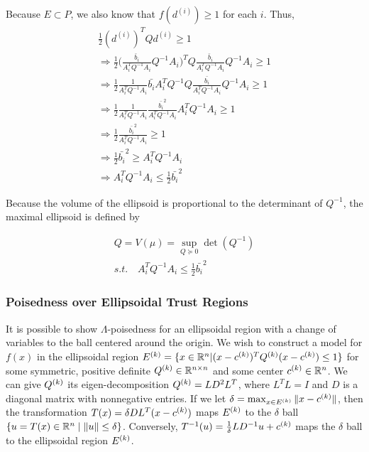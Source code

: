 Because $E \subset P$, we also know that $f(d^{(i)}) \ge 1$ for each $i$. Thus,
\begin{align*}
\frac 1 2 (d^{(i)})^{T} Q d^{(i)} \ge 1 \\
\Longrightarrow \frac 1 2 \bigg(\frac {\bar{b}_i}{A_i^T  Q^{-1}A_i}  Q^{-1}A_i\bigg)^{T} Q \frac {\bar{b}_i}{A_i^T  Q^{-1}A_i}  Q^{-1}A_i \ge 1 \\
\Longrightarrow \frac 1 2 \frac {1}{A_i^T  Q^{-1}A_i}  \bar{b_i} A_i^T Q^{-1} Q \frac {\bar{b_i}}{A_i^T  Q^{-1}A_i}  Q^{-1}A_i \ge 1 \\
\Longrightarrow \frac 1 2 \frac {1}{A_i^T  Q^{-1}A_i}  \frac {\bar{b_i}^2}{A_i^T  Q^{-1}A_i}  A_i^T Q^{-1}A_i \ge 1 \\
\Longrightarrow \frac 1 2  \frac {\bar{b_i}^2}{A_i^T  Q^{-1}A_i} \ge 1 \\
\Longrightarrow \frac 1 2 \bar{b_i}^2\ge A_i^T  Q^{-1}A_i \\
\Longrightarrow A_i^T  Q^{-1}A_i \le \frac 1 2 \bar{b_i}^2
\end{align*}

Because the volume of the ellipsoid is proportional to the determinant of $Q^{-1}$, the maximal ellipsoid is defined by

\begin{align}
 Q = V(\mu) = \sup_{Q \succeq 0} \det(Q^{-1})  \label{ellipse_1} \\
s.t. \quad A_i^T Q^{-1} A_i \le \frac 1 2 \bar{b_i}^2
\end{align}


\subsubsection{Poisedness over Ellipsoidal Trust Regions}
\label{ellipsoidal_lambda}

It is possible to show $\Lambda$-poisedness for an ellipsoidal region with a change of variables to the ball centered around the origin.
We wish to construct a model for $f(x)$ in the ellipsoidal region
${E^{(k)}} = \{x \in \mathbb R^n | (x - {c^{(k)}})^T{Q^{(k)}}(x - {c^{(k)}}) \le 1\}$ for some symmetric, positive definite
${Q^{(k)}} \in \mathbb R^{n\times n}$ and some center ${c^{(k)}} \in \mathbb R^n$.
We can give ${Q^{(k)}}$ its eigen-decomposition ${Q^{(k)}} = L D^2 L^T$, where $L^TL = I$ and $D$ is a diagonal matrix with nonnegative entries.
If we let $\delta = \max_{x\in {E^{(k)}}}\|x-{c^{(k)}}\|$, then the transformation $T(x) = \delta DL^T(x - {c^{(k)}})$ maps $ {E^{(k)}} $ to the $\delta$ ball $\{u = T(x) \in \mathbb R^n \; | \; \|u\| \le \delta\}$.
Conversely, $ T^{-1}(u) = \frac 1 {\delta} LD^{-1}u + {c^{(k)}}$ maps the $\delta$ ball to the ellipsoidal region $ {E^{(k)}} $.


